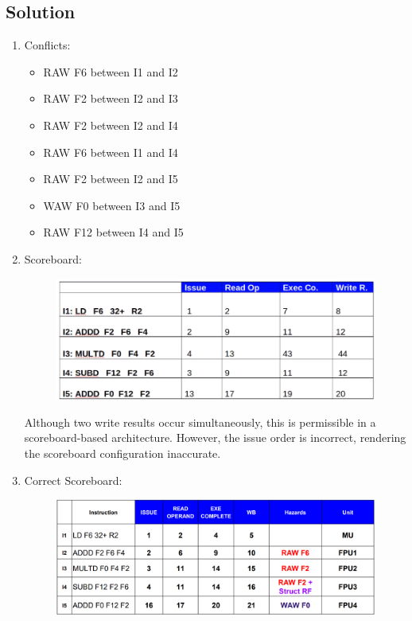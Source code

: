 \subsection*{Solution}
\begin{enumerate}
    \item Conflicts:
        \begin{itemize}
            \item RAW F6 between I1 and I2
            \item RAW F2 between I2 and I3
            \item RAW F2 between I2 and I4
            \item RAW F6 between I1 and I4
            \item RAW F2 between I2 and I5
            \item WAW F0 between I3 and I5
            \item RAW F12 between I4 and I5
        \end{itemize}
    \item Scoreboard:
        \begin{figure}[H]
            \centering
            \includegraphics[width=1\linewidth]{images/score.png}
        \end{figure}
        Although two write results occur simultaneously, this is permissible in a scoreboard-based architecture. 
        However, the issue order is incorrect, rendering the scoreboard configuration inaccurate.
    \item Correct Scoreboard:
        \begin{figure}[H]
            \centering
            \includegraphics[width=1\linewidth]{images/score1.png}
        \end{figure}
\end{enumerate}